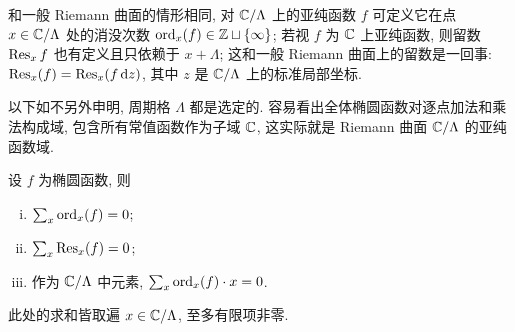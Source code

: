 和一般 Riemann 曲面的情形相同, 对 $\mathbb{C}/\Lambda$ 上的亚纯函数 $f$ 可定义它在点 $x \in \mathbb{C}/\Lambda$ 处的消没次数 $\operatorname*{ord}_x(f) \in \mathbb{Z} \sqcup \{\infty\}$; 若视 $f$ 为 $\mathbb{C}$ 上亚纯函数, 则留数 $\operatorname{Res}_x{f}$ 也有定义且只依赖于 $x + \Lambda$; 这和一般 Riemann 曲面上的留数是一回事: $\operatorname{Res}_x(f) = \operatorname{Res}_x(f \mathop{}\!\mathrm{d} z)$, 其中 $z$ 是 $\mathbb{C}/\Lambda$ 上的标准局部坐标.

以下如不另外申明, 周期格 $\Lambda$ 都是选定的. 容易看出全体椭圆函数对逐点加法和乘法构成域, 包含所有常值函数作为子域 $\mathbb{C}$, 这实际就是 Riemann 曲面 $\mathbb{C}/\Lambda$ 的亚纯函数域.

\begin{lemma}\label{prop:ell-prep}
	设 $f$ 为椭圆函数, 则
	\begin{enumerate}[(i)]
		\item $\sum_x \operatorname*{ord}_x(f) = 0$;
		\item $\sum_x \operatorname{Res}_x(f) = 0$;
		\item 作为 $\mathbb{C}/\Lambda$ 中元素, $\sum_x \operatorname*{ord}_x(f) \cdot x = 0$.
	\end{enumerate}
	此处的求和皆取遍 $x \in \mathbb{C}/\Lambda$, 至多有限项非零.
\end{lemma}
